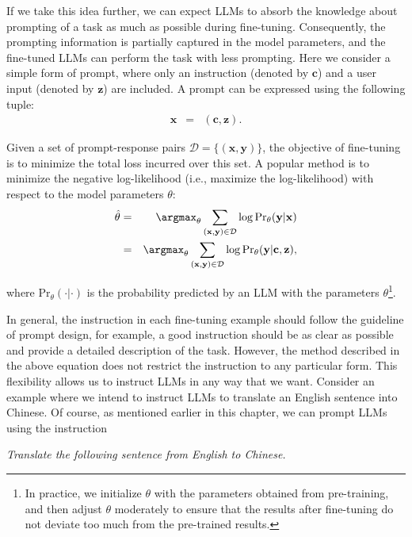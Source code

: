 If we take this idea further, we can expect LLMs to absorb the knowledge about prompting of a task as much as possible during fine-tuning. Consequently, the prompting information is partially captured in the model parameters, and the fine-tuned LLMs can perform the task with less prompting. Here we consider a simple form of prompt, where only an instruction (denoted by $\mathbf{c}$) and a user input (denoted by $\mathbf{z}$) are included. A prompt can be expressed using the following tuple:
\begin{eqnarray}
\mathbf{x} & = & (\mathbf{c}, \mathbf{z}).
\end{eqnarray}

Given a set of prompt-response pairs $\mathcal{D}=\{(\mathbf{x},\mathbf{y})\}$, the objective of fine-tuning is to minimize the total loss incurred over this set. A popular method is to minimize the negative log-likelihood (i.e., maximize the log-likelihood) with respect to the model parameters $\theta$:
\begin{eqnarray}
\hat{\theta} & = & \argmax_{\theta} \sum_{(\mathbf{x},\mathbf{y}) \in \mathcal{D}} \log \mathrm{Pr}_{\theta}(\mathbf{y}|\mathbf{x}) \nonumber \\
             & = & \argmax_{\theta} \sum_{(\mathbf{x},\mathbf{y}) \in \mathcal{D}} \log \mathrm{Pr}_{\theta}(\mathbf{y}|\mathbf{c}, \mathbf{z}),
\end{eqnarray}

\noindent where $\mathrm{Pr}_{\theta}(\cdot|\cdot)$ is the probability predicted by an LLM with the parameters $\theta$\footnote{In practice, we initialize $\theta$ with the parameters obtained from pre-training, and then adjust $\theta$ moderately to ensure that the results after fine-tuning do not deviate too much from the pre-trained results.}.

In general, the instruction in each fine-tuning example should follow the guideline of prompt design, for example, a good instruction should be as clear as possible and provide a detailed description of the task. However, the method described in the above equation does not restrict the instruction to any particular form. This flexibility allows us to instruct LLMs in any way that we want. Consider an example where we intend to instruct LLMs to translate an English sentence into Chinese. Of course, as mentioned earlier in this chapter, we can prompt LLMs using the instruction

\vspace{1em}
\hspace{4em} \textit{Translate the following sentence from English to Chinese.}
\vspace{1em}

